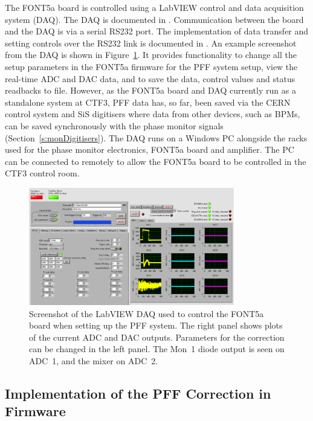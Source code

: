 The FONT5a board is controlled using a LabVIEW control and data acquisition system (DAQ). The DAQ is documented in \cite{dougThesis}. Communication between the board and the DAQ is via a serial RS232 port. The implementation of data transfer and setting controls over the RS232 link is documented in \cite{benThesis}. An example screenshot from the DAQ is shown in Figure~\ref{f:DAQScreenshot}. It provides functionality to change all the setup parameters in the FONT5a firmware for the PFF system setup, view the real-time ADC and DAC data, and to save the data, control values and status readbacks to file. However, as the FONT5a board and DAQ currently run as a standalone system at CTF3, PFF data has, so far, been saved via the CERN control system and SiS digitisers where data from other devices, such as BPMs, can be saved synchronously with the phase monitor signals (Section~\ref{s:monDigitisers}). The DAQ runs on a Windows PC alongside the racks used for the phase monitor electronics, FONT5a board and amplifier. The PC can be connected to remotely to allow the FONT5a board to be controlled in the CTF3 control room.

\begin{figure}
  \centering
  \includegraphics[width=0.8\textwidth]{Figures/commissioning/DAQScreenshot}
  \caption{Screenshot of the LabVIEW DAQ used to control the FONT5a board when setting up the PFF system. The right panel shows plots of the current ADC and DAC outputs. Parameters for the correction can be changed in the left panel. The Mon~1 diode output is seen on ADC~1, and the mixer on ADC~2.}
  \label{f:DAQScreenshot}
\end{figure}

\subsection{Implementation of the PFF Correction in Firmware}
\label{ss:pffFirmware}

